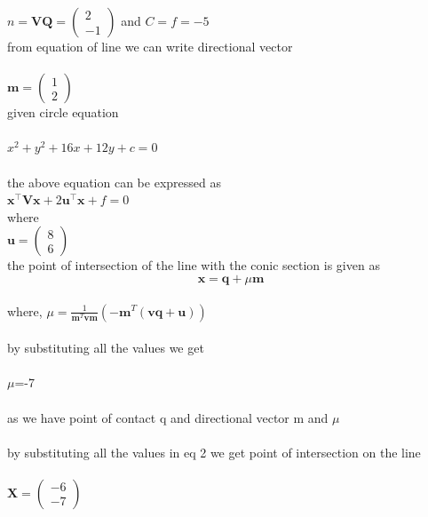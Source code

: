 \documentclass[journal,12pt,twocolumn]{article}
\newcommand{\myvec}[1]{\ensuremath{\begin{pmatrix}#1\end{pmatrix}}}
\let\vec\mathbf
\begin{document}
$n=\vec{VQ} = \myvec{2\\-1}$ and $C=f=-5$
\\

from equation of line we can write directional vector\\
\\$\vec{m}=\myvec{1\\2}$
\\

given circle equation\\
\\
$x^2+y^2+16x+12y+c=0$\\
\\
the above equation can be expressed as
\\
${\vec{x^{\top}V x} + 2\vec{u^{\top}x}} + f=0$
\\
where
\\

$ \vec{u}=\myvec{8\\6} $
\\ 
the point of intersection of the line with the conic section is given as
\\
\begin{equation}
\vec{x}=\vec{q}+\mu\vec{m}
\end{equation}\\
where, 
$\mu=\frac{1}{\vec{m}^{T}\vec{v}\vec{m}}(-\vec{m}^{T}(\vec{v}\vec{q}+\vec{u}))$\\
\\
by substituting all the values we get\\
\\
$\mu$=-7
\\ \\
as we have point of contact q and directional vector m and $\mu$
\\ \\
by substituting all the values  in eq 2 we get point of intersection on the line\\
\\
$\vec{X}=\myvec{-6 \\ -7}$
\\
\end{document}
